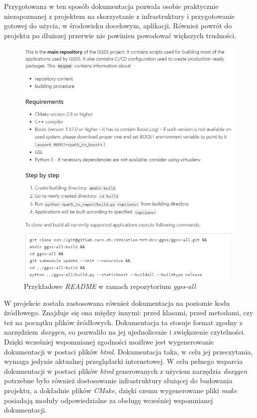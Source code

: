 Przygotowana w ten sposób dokumentacja pozwala osobie praktycznie niezapoznanej z projektem na skorzystanie z infrastruktury i przygotowanie gotowej do użycia, w środowisku docelowym, aplikacji. Również powrót do projektu po dłuższej przerwie nie powinien powodować większych trudności.
\newpage
\begin{figure}[H]
    \centering
    \includegraphics[width=\textwidth]{components/practices_res/readme}
    \caption{Przykładowe \emph{README} w ramach repozytorium \emph{ggss-all}}
    \label{fig:readme}
\end{figure} %

W projekcie została zastosowana również dokumentacja na poziomie kodu źródłowego. Znajduje się ona między innymi: przed klasami, przed metodami, czy też na początku plików źródłowych. Dokumentacja ta stosuje format zgodny z narzędziem \emph{doxygen}, co pozwaliło na jej ujednolicenie i zwiększenie czytelności. Dzięki wcześniej wspomnianej zgodności możliwe jest wygenerowanie dokumentacji w postaci plików \emph{html}. Dokumentacja taka, w celu jej przeczytania, wymaga jedynie aktualnej przeglądarki internetowej. W celu pełnego wsparcia dokumentacji w postaci plików \emph{html} generowanych z użyciem narzędzia \emph{doxygen} potrzebne było również dostosowanie infrastruktury służącej do budowania projektu, a dokładnie plików \emph{CMake}, dzięki czemu wygenerowane pliki \emph{make} posiadają moduły odpowiedzialne za obsługę wcześniej wspomnianej dokumentacji.

